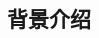 \documentclass[12pt, a4paper, oneside]{article}
\title{}
\date{\today}
\author{Alphabetium}
\begin{document}
\begin{spacing}{2.0}
\tableofcontents
\maketitle


\section{背景介绍}









\end{spacing}{}


\end{document}
